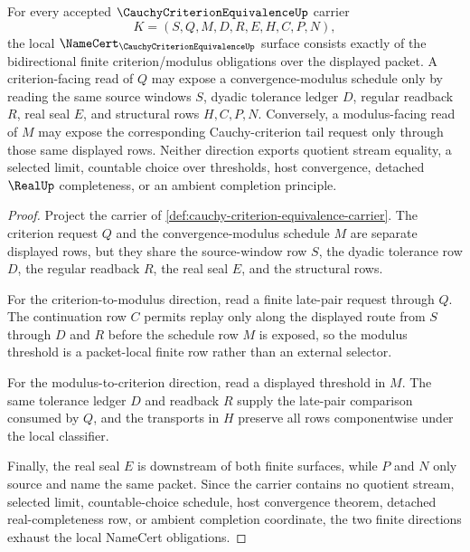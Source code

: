 \begin{theorem}
\label{thm:cauchy-criterion-equivalence-namecert-obligations}
For every accepted $\CauchyCriterionEquivalenceUp$ carrier
$$
K=(S,Q,M,D,R,E,H,C,P,N),
$$
the local $\NameCert_{\CauchyCriterionEquivalenceUp}$ surface consists exactly of the bidirectional finite criterion/modulus obligations over the displayed packet. A criterion-facing read of $Q$ may expose a convergence-modulus schedule only by reading the same source windows $S$, dyadic tolerance ledger $D$, regular readback $R$, real seal $E$, and structural rows $H,C,P,N$. Conversely, a modulus-facing read of $M$ may expose the corresponding Cauchy-criterion tail request only through those same displayed rows. Neither direction exports quotient stream equality, a selected limit, countable choice over thresholds, host convergence, detached $\RealUp$ completeness, or an ambient completion principle.
\end{theorem}
\begin{proof}
Project the carrier of \autoref{def:cauchy-criterion-equivalence-carrier}. The criterion request $Q$ and the convergence-modulus schedule $M$ are separate displayed rows, but they share the source-window row $S$, the dyadic tolerance row $D$, the regular readback $R$, the real seal $E$, and the structural rows.

For the criterion-to-modulus direction, read a finite late-pair request through $Q$. The continuation row $C$ permits replay only along the displayed route from $S$ through $D$ and $R$ before the schedule row $M$ is exposed, so the modulus threshold is a packet-local finite row rather than an external selector.

For the modulus-to-criterion direction, read a displayed threshold in $M$. The same tolerance ledger $D$ and readback $R$ supply the late-pair comparison consumed by $Q$, and the transports in $H$ preserve all rows componentwise under the local classifier.

Finally, the real seal $E$ is downstream of both finite surfaces, while $P$ and $N$ only source and name the same packet. Since the carrier contains no quotient stream, selected limit, countable-choice schedule, host convergence theorem, detached real-completeness row, or ambient completion coordinate, the two finite directions exhaust the local NameCert obligations.
\end{proof}

